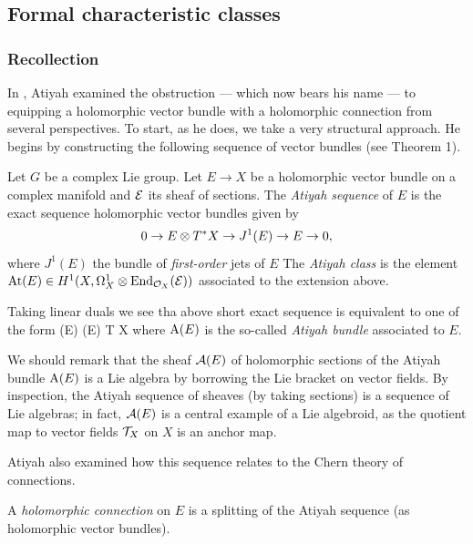 \documentclass[10pt]{amsart}
\begin{document}
\subsection{Formal characteristic classes}

\subsubsection{Recollection}

In \cite{atiyah}, Atiyah examined the obstruction --- which now bears his name --- to equipping a holomorphic vector bundle with a holomorphic connection from several perspectives. To start, as he does, we take a very structural approach. He begins by constructing the following sequence of vector bundles (see Theorem 1).

\begin{dfn}
Let $G$ be a complex Lie group. Let $E \to X$ be a holomorphic vector
bundle on a complex manifold and $\mathcal E$ its sheaf of sections. The {\em Atiyah sequence} of $E$ is the
exact sequence holomorphic vector bundles given by
\[
0 \to E \otimes T^* X \to J^1(E) \to E \to 0,
\]
where $J^1(E)$ the bundle of {\em first-order} jets of $E$
The {\em Atiyah class} is the element ${\rm At}(E) \in H^1(X, \Omega^1_X
\otimes {\rm End}_{\mathcal O_X} (\mathcal E))$ associated to the extension above. 
\end{dfn}

\begin{rmk}
Taking linear duals we see tha above short exact sequence is
equivalent to one of the form
 \to \End (E) (E) \to T X 
\een
where ${\rm A}(E)$ is the so-called {\em Atiyah bundle} associated to $E$. 

We should remark that the sheaf $\mathcal A(E)$ of holomorphic sections of the Atiyah bundle ${\rm A}(E)$ is a Lie algebra by borrowing the Lie bracket on vector fields.
By inspection, the Atiyah sequence of sheaves (by taking sections) is a sequence of Lie algebras; 
 in fact, $\mathcal A(E)$ is a central example of a Lie algebroid, as the quotient map to vector fields $\mathcal T_X$ on $X$ is an anchor map.
\end{rmk}

Atiyah also examined how this sequence relates to the Chern theory of connections.

\begin{prop} 
A {\em holomorphic connection} on $E$ is a splitting of the Atiyah sequence (as holomorphic vector bundles).
\end{prop}
\end{document}
